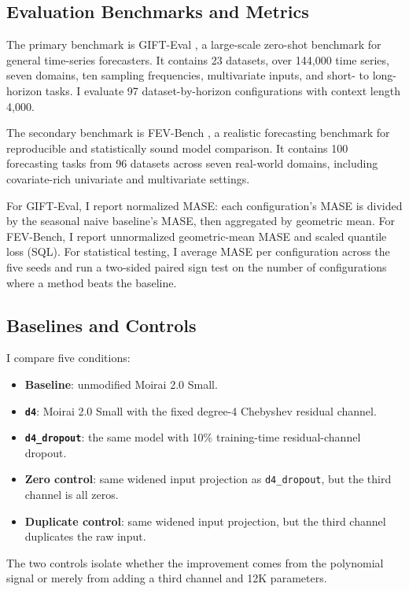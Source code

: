 \documentclass[11pt]{article}
\begin{document}
\subsection{Evaluation Benchmarks and Metrics}

The primary benchmark is GIFT-Eval \citep{vijay2024gifteval}, a large-scale zero-shot benchmark for general time-series forecasters. It contains 23 datasets, over 144,000 time series, seven domains, ten sampling frequencies, multivariate inputs, and short- to long-horizon tasks. I evaluate 97 dataset-by-horizon configurations with context length 4,000.

The secondary benchmark is FEV-Bench \citep{shchur2025fevbench}, a realistic forecasting benchmark for reproducible and statistically sound model comparison. It contains 100 forecasting tasks from 96 datasets across seven real-world domains, including covariate-rich univariate and multivariate settings.

For GIFT-Eval, I report normalized MASE: each configuration's MASE is divided by the seasonal naive baseline's MASE, then aggregated by geometric mean. For FEV-Bench, I report unnormalized geometric-mean MASE and scaled quantile loss (SQL). For statistical testing, I average MASE per configuration across the five seeds and run a two-sided paired sign test on the number of configurations where a method beats the baseline.

\subsection{Baselines and Controls}

I compare five conditions:
\begin{itemize}
  \item \textbf{Baseline}: unmodified Moirai 2.0 Small.
  \item \textbf{\texttt{d4}}: Moirai 2.0 Small with the fixed degree-4 Chebyshev residual channel.
  \item \textbf{\texttt{d4\_dropout}}: the same model with 10\% training-time residual-channel dropout.
  \item \textbf{Zero control}: same widened input projection as \texttt{d4\_dropout}, but the third channel is all zeros.
  \item \textbf{Duplicate control}: same widened input projection, but the third channel duplicates the raw input.
\end{itemize}
The two controls isolate whether the improvement comes from the polynomial signal or merely from adding a third channel and 12K parameters.
\end{document}
